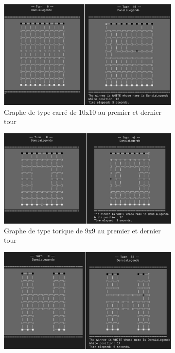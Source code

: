\documentclass[11pt]{article}
\begin{document}
\begin{figure}[H]
    \centering
    \begin{subfigure}{.48\textwidth}
        \centering
        \includegraphics[width=\linewidth, height=.6\linewidth]{display-c.png}
        \caption{Graphe de type carré de 10x10 au premier et dernier tour}
        \label{fig:display-c}
        \hfill
    \end{subfigure}
    \hfill
    \begin{subfigure}{.48\textwidth}
        \centering
        \includegraphics[width=\linewidth, height=.6\linewidth]{display-t.png}
        \caption{Graphe de type torique de 9x9 au premier et dernier tour}
        \label{fig:display-t}
        \hfill
    \end{subfigure}
    \hfill
    \begin{subfigure}{.48\textwidth}
        \centering
        \includegraphics[width=\linewidth, height=.6\linewidth]{display-h.png}

\end{subfigure}
\end{figure}
\end{document}
